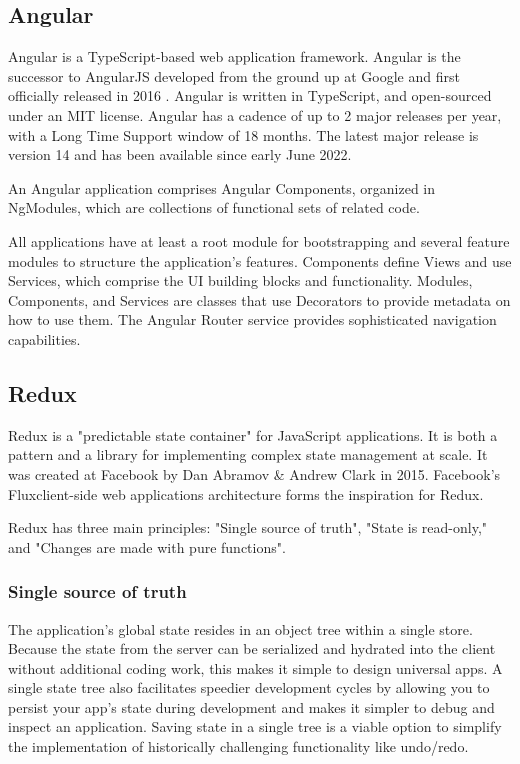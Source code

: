 \subsection{Angular}
Angular is a TypeScript-based web application framework. Angular is the successor to AngularJS developed from the ground up at Google and first officially released in 2016 . Angular is written in TypeScript, and open-sourced under an MIT license. Angular has a cadence of up to 2 major releases per year, with a Long Time Support window of 18 months. The latest major release is version 14 and has been available since early June 2022.

An Angular application comprises Angular Components, organized in NgModules, which are collections of functional sets of related code.

All applications have at least a root module for bootstrapping and several feature modules to structure the application's features. Components define Views and use Services, which comprise the UI building blocks and functionality. Modules, Components, and Services are classes that use Decorators to provide metadata on how to use them. The Angular Router service provides sophisticated navigation capabilities.
\subsection{Redux}
Redux is a "predictable state container" for JavaScript applications. It is both a pattern and a library for implementing complex state management at scale. It was created at Facebook by Dan Abramov \& Andrew Clark in 2015. Facebook's Fluxclient-side web applications architecture forms the inspiration for Redux. 

Redux has three main principles: "Single source of truth", "State is read-only," and "Changes are made with pure functions".
\subsubsection{Single source of truth}
The application's global state resides in an object tree within a single store.
Because the state from the server can be serialized and hydrated into the client without additional coding work, this makes it simple to design universal apps. A single state tree also facilitates speedier development cycles by allowing you to persist your app's state during development and makes it simpler to debug and inspect an application. Saving state in a single tree is a viable option to simplify the implementation of historically challenging functionality like undo/redo.

